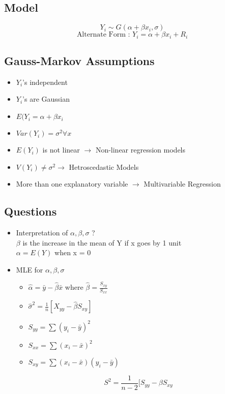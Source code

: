 \documentclass{article}
\begin{document}
\subsection{Model}
$$ Y_i \sim G(\alpha + \beta x_i , \sigma) $$
$$ \text{Alternate Form : } Y_i = \alpha + \beta x_i + R_i $$

\subsection{Gauss-Markov Assumptions}
\begin{itemize}
\item \(Y_i\)'s independent
\item \(Y_i\)'s are Gaussian 
\item \(E(Y_i = \alpha + \beta x_i\) 
\item \(Var(Y_i) = \sigma^2 \forall x\) 
\item \(E(Y_i)\) is not linear \(\longrightarrow\) Non-linear regression models
\item \(V(Y_i) \neq \sigma^2 \longrightarrow \) Hetroscedastic  Models
\item More than one explanatory variable \(\longrightarrow\) Multivariable Regression
\end{itemize}

\subsection{Questions }
\begin{itemize}
\item Interpretation of \(\alpha, \beta, \sigma\) ? \\
\(\beta\) is the increase in the mean of Y if x goes by 1 unit \\
\(\alpha = E(Y) \) when x = 0
\item MLE for \(\alpha, \beta, \sigma\)\\
\begin{itemize}
\item \(\hat{\alpha} = \bar{y} - \hat{\beta} \bar{x}\) where \(\hat{\beta} = \frac{S_{xy}}{S_{xx}} \)\\
\item \(\hat{\sigma}^2 = \frac{1}{n}[X_{yy} - \hat{\beta} S_{xy}] \)
\item \(S_{yy} = \sum (y_i - \bar{y})^2\)
\item \(S_{xx}  = \sum ( x_i - \bar{x})^2\)
\item \(S_{xy}  = \sum (x_i - \bar{x}) (y_i  - \bar{y}) \)
\end{itemize}
$$ S^2 = \frac{1}{n-2} [S_{yy} - \beta S_{xy} $$
\end{itemize}
\end{document}
